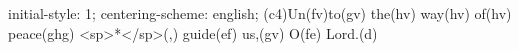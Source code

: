 initial-style: 1;
centering-scheme: english;
(c4)Un(fv)to(gv) the(hv) way(hv) of(hv) peace(ghg) <sp>*</sp>(,) guide(ef) us,(gv) O(fe) Lord.(d)
